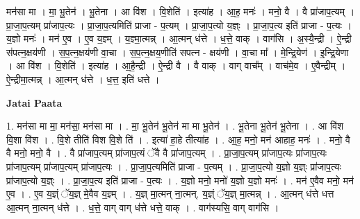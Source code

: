 \documentclass[17pt]{extarticle}
\begin{document}
मन॑सा मा । मा॒ भू॒तेन॑ । भू॒तेना । आ वि॑श । वि॒शेति॑ । इत्या॑ह । आ॒ह॒ मनः॑ । मनो॒ वै । वै प्रा॑जाप॒त्यम् । प्रा॒जा॒प॒त्यम् प्रा॑जाप॒त्यः । प्रा॒जा॒प॒त्यमिति॑ प्राजा - प॒त्यम् । प्रा॒जा॒प॒त्यो य॒ज्ञ्ः । प्रा॒जा॒प॒त्य इति॑ प्राजा - प॒त्यः । य॒ज्ञो मनः॑ । मन॑ ए॒व । ए॒व य॒ज्ञ्म् । य॒ज्ञ्मा॒त्मन्न् । आ॒त्मन् ध॑त्ते । ध॒त्ते॒ वाक् । वाग॑सि । अ॒स्यै॒न्द्री । ऐ॒न्द्री स॑पत्न॒क्षय॑णी । स॒प॒त्न॒क्षय॑णी वा॒चा । स॒प॒त्न॒क्षय॒णीति॑ सपत्न - क्षय॑णी । वा॒चा मा᳚ । मे॒न्द्रि॒येण॑ । इ॒न्द्रि॒येणा । आ वि॑श । वि॒शेति॑ । इत्या॑ह । आ॒है॒न्द्री । ऐ॒न्द्री वै । वै वाक् । वाग् वाच᳚म् । वाच॑मे॒व । ए॒वैन्द्रीम् । ऐ॒न्द्रीमा॒त्मन्न् । आ॒त्मन् ध॑त्ते । ध॒त्त॒ इति॑ धत्ते । \newline

\textbf{Jatai Paata} \newline

1. मन॑सा मा मा॒ मन॑सा॒ मन॑सा मा । . मा॒ भू॒तेन॑ भू॒तेन॑ मा मा भू॒तेन॑ । . भू॒तेना भू॒तेन॑ भू॒तेना । . आ वि॑श वि॒शा वि॑श । . वि॒शे तीति॑ विश वि॒शे ति॑ । . इत्या॑ हा॒हे तीत्या॑ह । . आ॒ह॒ मनो॒ मन॑ आहाह॒ मनः॑ । . मनो॒ वै वै मनो॒ मनो॒ वै । . वै प्रा॑जाप॒त्यम् प्रा॑जाप॒त्यं ॅवै वै प्रा॑जाप॒त्यम् । . प्रा॒जा॒प॒त्यम् प्रा॑जाप॒त्यः प्रा॑जाप॒त्यः प्रा॑जाप॒त्यम् प्रा॑जाप॒त्यम् प्रा॑जाप॒त्यः । . प्रा॒जा॒प॒त्यमिति॑ प्राजा - प॒त्यम् । . प्रा॒जा॒प॒त्यो य॒ज्ञो य॒ज्ञ्ः प्रा॑जाप॒त्यः प्रा॑जाप॒त्यो य॒ज्ञ्ः । . प्रा॒जा॒प॒त्य इति॑ प्राजा - प॒त्यः । . य॒ज्ञो मनो॒ मनो॑ य॒ज्ञो य॒ज्ञो मनः॑ । . मन॑ ए॒वैव मनो॒ मन॑ ए॒व । . ए॒व य॒ज्ञ्ं ॅय॒ज्ञ् मे॒वैव य॒ज्ञ्म् । . य॒ज्ञ् मा॒त्मन् ना॒त्मन्. य॒ज्ञ्ं ॅय॒ज्ञ् मा॒त्मन्न् । . आ॒त्मन् ध॑त्ते धत्त आ॒त्मन् ना॒त्मन् ध॑त्ते । . ध॒त्ते॒ वाग् वाग् ध॑त्ते धत्ते॒ वाक् । . वाग॑स्यसि॒ वाग् वाग॑सि । \newline
\end{document}
